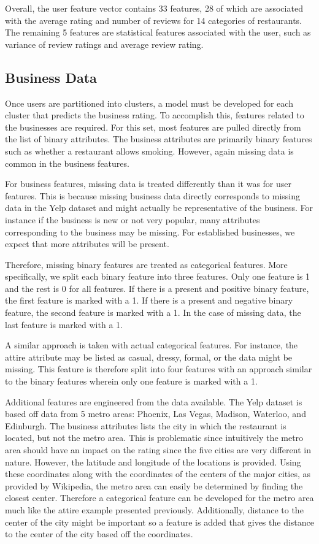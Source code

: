 \documentclass[11pt]{article}
\begin{document}
Overall, the user feature vector contains 33 features, 28 of which are associated with the average rating and number of reviews for 14 categories of restaurants. The remaining 5 features are statistical features associated with the user, such as variance of review ratings and average review rating.

\subsection{Business Data}

Once users are partitioned into clusters, a model must be developed for each cluster that predicts the business rating. To accomplish this, features related to the businesses are required. For this set, most features are pulled directly from the list of binary attributes. The business attributes are primarily binary features such as whether a restaurant allows smoking. However, again missing data is common in the business features.

For business features, missing data is treated differently than it was for user features. This is because missing business data directly corresponds to missing data in the Yelp dataset and might actually be representative of the business. For instance if the business is new or not very popular, many attributes corresponding to the business may be missing. For established businesses, we expect that more attributes will be present. 

Therefore, missing binary features are treated as categorical features. More specifically, we split each binary feature into three features. Only one feature is 1 and the rest is 0 for all features. If there is a present and positive binary feature, the first feature is marked with a 1. If there is a present and negative binary feature, the second feature is marked with a 1. In the case of missing data, the last feature is marked with a 1. 

A similar approach is taken with actual categorical features. For instance, the attire attribute may be listed as casual, dressy, formal, or the data might be missing. This feature is therefore split into four features with an approach similar to the binary features wherein only one feature is marked with a 1.

Additional features are engineered from the data available. The Yelp dataset is based off data from 5 metro areas: Phoenix, Las Vegas, Madison, Waterloo, and Edinburgh. The business attributes lists the city in which the restaurant is located, but not the metro area. This is problematic since intuitively the metro area should have an impact on the rating since the five cities are very different in nature. However, the latitude and longitude of the locations is provided. Using these coordinates along with the coordinates of the centers of the major cities, as provided by Wikipedia, the metro area can easily be determined by finding the closest center. Therefore a categorical feature can be developed for the metro area much like the attire example presented previously. Additionally, distance to the center of the city might be important so a feature is added that gives the distance to the center of the city based off the coordinates.
\end{document}
